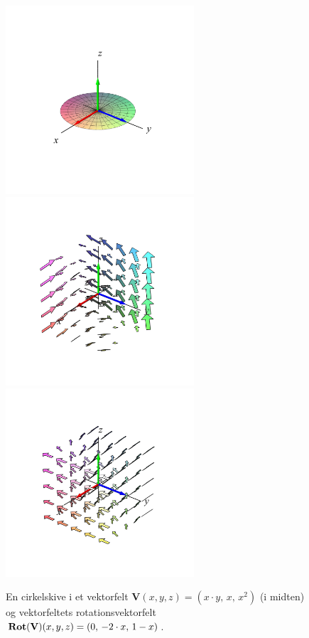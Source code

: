 \begin{figure}[h]
\centerline{\includegraphics[height=70mm]{FIGS/plotDiskStokes1}\includegraphics[height=70mm]{FIGS/plotDiskStokes2}\includegraphics[height=70mm]{FIGS/plotDiskStokes3}}
\begin{center}
\caption{\small{En cirkelskive i et vektorfelt $\mathbf{V}(x,y,z) = (x\cdot y, \, x, \, x^{2})$ (i midten) og  vektorfeltets rotationsvektorfelt  $\operatorname{\mathbf{Rot}}(\mathbf{V})(x,y,z)= (0, \, -2\cdot x, \, 1-x)$.}}
\label{figDiskStokesA}
\end{center}
\end{figure}



